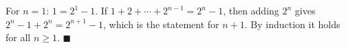 For $n=1$: $1=2^1-1$. If $1+2+\cdots+2^{n-1}=2^n-1$, then adding $2^n$ gives $2^n-1+2^n=2^{n+1}-1$, which is the statement for $n+1$. By induction it holds for all $n\ge1$. $\blacksquare$
